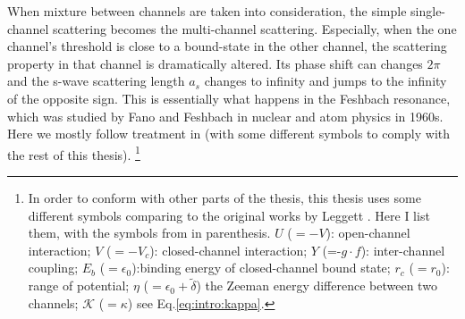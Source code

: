 When mixture between channels are taken into consideration, the simple single-channel scattering becomes the multi-channel scattering.  Especially, when the one channel's threshold is close to a bound-state in the other channel, the scattering property in that channel is dramatically altered.  Its phase shift can changes $2\pi$ and the s-wave scattering length $a_{s}$ changes to infinity and jumps to the infinity of the opposite sign.  This is essentially what happens in the Feshbach resonance, which was studied by Fano\cite{Fano} and Feshbach \cite{nuclear}  in nuclear and atom physics in 1960s.  Here we  mostly follow treatment in \cite{Leggett} (with some different symbols to comply with the rest of this thesis). 
\footnote{In order to conform with other parts of the thesis, this thesis uses some different symbols comparing to the original works by Leggett \cite{Leggett}.  Here I list them, with the symbols from \cite{Leggett} in parenthesis.  $U$ ($=-V$): open-channel interaction; $V$ ($=-V_{c}$): closed-channel interaction; $Y$ (=-$g\cdot{}f$): inter-channel coupling; $E_{b}$ ($=\epsilon_{0}$):binding energy of closed-channel bound state; $r_{c}$ ($=r_{0}$): range of potential; $\eta$ ($=\epsilon_0+\tilde\delta$) the Zeeman energy difference between two channels; $\mathcal{K}$ ($=\kappa$) see Eq.\ref{eq:intro:kappa}.}

